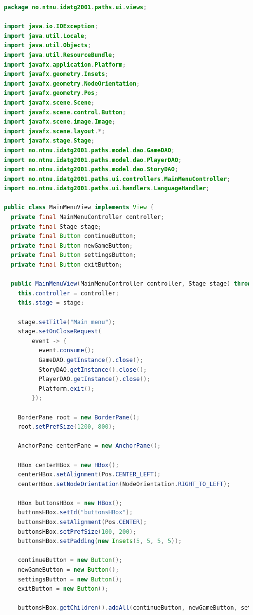 \documentclass[British]{article}
\begin{document}
\begin{lstlisting}[language=Java,caption={MainMenuView class with View. Source: Primary.}]
package no.ntnu.idatg2001.paths.ui.views;

import java.io.IOException;
import java.util.Locale;
import java.util.Objects;
import java.util.ResourceBundle;
import javafx.application.Platform;
import javafx.geometry.Insets;
import javafx.geometry.NodeOrientation;
import javafx.geometry.Pos;
import javafx.scene.Scene;
import javafx.scene.control.Button;
import javafx.scene.image.Image;
import javafx.scene.layout.*;
import javafx.stage.Stage;
import no.ntnu.idatg2001.paths.model.dao.GameDAO;
import no.ntnu.idatg2001.paths.model.dao.PlayerDAO;
import no.ntnu.idatg2001.paths.model.dao.StoryDAO;
import no.ntnu.idatg2001.paths.ui.controllers.MainMenuController;
import no.ntnu.idatg2001.paths.ui.handlers.LanguageHandler;

public class MainMenuView implements View {
  private final MainMenuController controller;
  private final Stage stage;
  private final Button continueButton;
  private final Button newGameButton;
  private final Button settingsButton;
  private final Button exitButton;

  public MainMenuView(MainMenuController controller, Stage stage) throws IOException {
    this.controller = controller;
    this.stage = stage;

    stage.setTitle("Main menu");
    stage.setOnCloseRequest(
        event -> {
          event.consume();
          GameDAO.getInstance().close();
          StoryDAO.getInstance().close();
          PlayerDAO.getInstance().close();
          Platform.exit();
        });

    BorderPane root = new BorderPane();
    root.setPrefSize(1200, 800);

    AnchorPane centerPane = new AnchorPane();

    HBox centerHBox = new HBox();
    centerHBox.setAlignment(Pos.CENTER_LEFT);
    centerHBox.setNodeOrientation(NodeOrientation.RIGHT_TO_LEFT);

    HBox buttonsHBox = new HBox();
    buttonsHBox.setId("buttonsHBox");
    buttonsHBox.setAlignment(Pos.CENTER);
    buttonsHBox.setPrefSize(100, 200);
    buttonsHBox.setPadding(new Insets(5, 5, 5, 5));

    continueButton = new Button();
    newGameButton = new Button();
    settingsButton = new Button();
    exitButton = new Button();

    buttonsHBox.getChildren().addAll(continueButton, newGameButton, settingsButton, exitButton);


\end{lstlisting}
\end{document}
